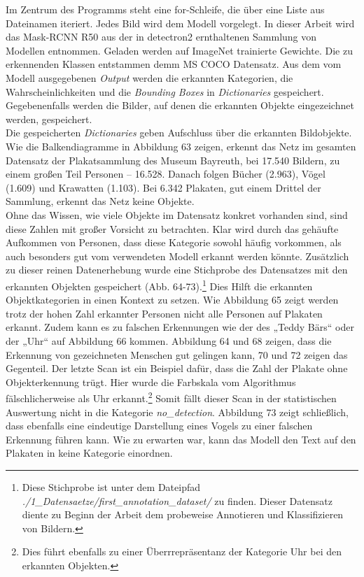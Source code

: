\documentclass[a4paper,12pt,ngerman]{article}
\begin{document}
Im Zentrum des Programms steht eine for-Schleife, die über eine Liste aus Dateinamen iteriert. Jedes Bild wird dem Modell vorgelegt. In dieser Arbeit wird das Mask-RCNN R50 aus der in detectron2 ernthaltenen Sammlung von Modellen entnommen. Geladen werden auf ImageNet trainierte Gewichte. Die zu erkennenden Klassen entstammen demm MS COCO Datensatz. Aus dem vom Modell ausgegebenen \textit{Output} werden die erkannten Kategorien, die Wahrscheinlichkeiten und die \textit{Bounding Boxes} in \textit{Dictionaries} gespeichert. Gegebenenfalls werden die Bilder, auf denen die erkannten Objekte eingezeichnet werden, gespeichert. \\
Die gespeicherten \textit{Dictionaries} geben Aufschluss über die erkannten Bildobjekte. Wie die Balkendiagramme in Abbildung 63 zeigen, erkennt das Netz im gesamten Datensatz der Plakatsammlung des Museum Bayreuth, bei 17.540 Bildern, zu einem großen Teil Personen -- 16.528. Danach folgen Bücher (2.963), Vögel (1.609) und Krawatten (1.103). Bei 6.342 Plakaten, gut einem Drittel der Sammlung, erkennt das Netz keine Objekte. \\
Ohne das Wissen, wie viele Objekte im Datensatz konkret vorhanden sind, sind diese Zahlen mit großer Vorsicht zu betrachten. Klar wird durch das gehäufte Aufkommen von Personen, dass diese Kategorie sowohl häufig vorkommen, als auch besonders gut vom verwendeten Modell erkannt werden könnte. Zusätzlich zu dieser reinen Datenerhebung wurde eine Stichprobe des Datensatzes mit den erkannten Objekten gespeichert (Abb. 64-73).\footnote{Diese Stichprobe ist unter dem Dateipfad \textit{./1\_Datensaetze/first\_annotation\_dataset/} zu finden. Dieser Datensatz diente zu Beginn der Arbeit dem probeweise Annotieren und Klassifizieren von Bildern.} Dies Hilft die erkannten Objektkategorien in einen Kontext zu setzen. Wie Abbildung 65 zeigt werden trotz der hohen Zahl erkannter Personen nicht alle Personen auf Plakaten erkannt. Zudem kann es zu falschen Erkennungen wie der des „Teddy Bärs“ oder der „Uhr“ auf Abbildung 66 kommen. Abbildung 64 und 68 zeigen, dass die Erkennung von gezeichneten Menschen gut gelingen kann, 70 und 72 zeigen das Gegenteil. Der letzte Scan ist ein Beispiel dafür, dass die Zahl der Plakate ohne Objekterkennung trügt. Hier wurde die Farbskala vom Algorithmus fälschlicherweise als Uhr erkannt.\footnote{Dies führt ebenfalls zu einer Überrrepräsentanz der Kategorie Uhr bei den erkannten Objekten.} Somit fällt dieser Scan in der statistischen Auswertung nicht in die Kategorie \textit{no\_detection}. Abbildung 73 zeigt schließlich, dass ebenfalls eine eindeutige Darstellung eines Vogels zu einer falschen Erkennung führen kann. Wie zu erwarten war, kann das Modell den Text auf den Plakaten in keine Kategorie einordnen. \\
\end{document}
